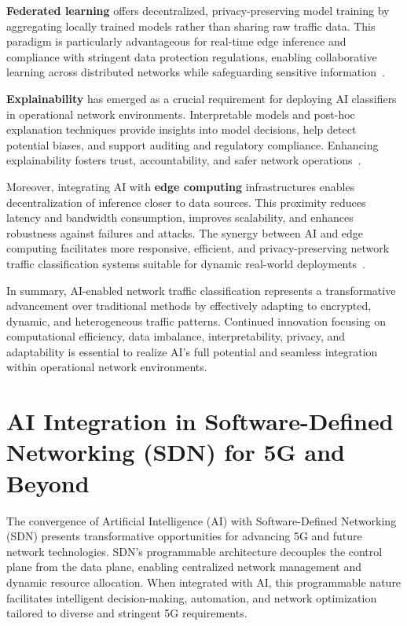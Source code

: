 \documentclass[sigconf]{acmart}
\begin{document}
\textbf{Federated learning} offers decentralized, privacy-preserving model training by aggregating locally trained models rather than sharing raw traffic data. This paradigm is particularly advantageous for real-time edge inference and compliance with stringent data protection regulations, enabling collaborative learning across distributed networks while safeguarding sensitive information~\cite{ref49,ref50,ref51}.

\textbf{Explainability} has emerged as a crucial requirement for deploying AI classifiers in operational network environments. Interpretable models and post-hoc explanation techniques provide insights into model decisions, help detect potential biases, and support auditing and regulatory compliance. Enhancing explainability fosters trust, accountability, and safer network operations~\cite{ref50,ref51}.

Moreover, integrating AI with \textbf{edge computing} infrastructures enables decentralization of inference closer to data sources. This proximity reduces latency and bandwidth consumption, improves scalability, and enhances robustness against failures and attacks. The synergy between AI and edge computing facilitates more responsive, efficient, and privacy-preserving network traffic classification systems suitable for dynamic real-world deployments~\cite{ref49,ref51}.

In summary, AI-enabled network traffic classification represents a transformative advancement over traditional methods by effectively adapting to encrypted, dynamic, and heterogeneous traffic patterns. Continued innovation focusing on computational efficiency, data imbalance, interpretability, privacy, and adaptability is essential to realize AI’s full potential and seamless integration within operational network environments.

\section{AI Integration in Software-Defined Networking (SDN) for 5G and Beyond}

The convergence of Artificial Intelligence (AI) with Software-Defined Networking (SDN) presents transformative opportunities for advancing 5G and future network technologies. SDN’s programmable architecture decouples the control plane from the data plane, enabling centralized network management and dynamic resource allocation. When integrated with AI, this programmable nature facilitates intelligent decision-making, automation, and network optimization tailored to diverse and stringent 5G requirements.
\end{document}
